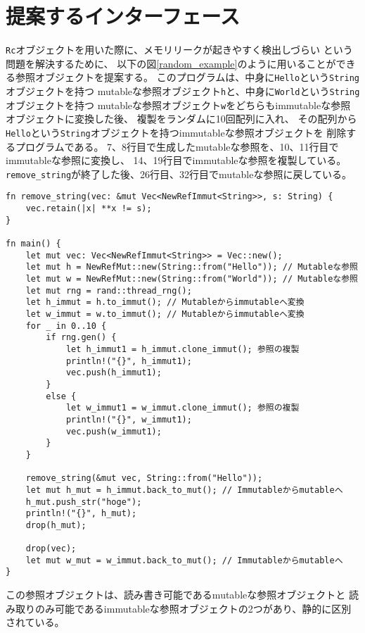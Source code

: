 \documentclass{sumiilab-paper}
\theoremstyle{mystyle}
\numberwithin{definition}{chapter} %
\begin{document}
\section{提案するインターフェース}
\texttt{Rc}オブジェクトを用いた際に、メモリリークが起きやすく検出しづらい
という問題を解決するために、
以下の図\ref{random_example}のように用いることができる参照オブジェクトを提案する。
このプログラムは、中身に\texttt{Hello}という\texttt{String}オブジェクトを持つ
mutableな参照オブジェクト\texttt{h}と、中身に\texttt{World}という\texttt{String}オブジェクトを持つ
mutableな参照オブジェクト\texttt{w}をどちらもimmutableな参照オブジェクトに変換した後、
複製をランダムに10回配列に入れ、
その配列から\texttt{Hello}という\texttt{String}オブジェクトを持つimmutableな参照オブジェクトを
削除するプログラムである。
7、8行目で生成したmutableな参照を、10、11行目でimmutableな参照に変換し、
14、19行目でimmutableな参照を複製している。
\texttt{remove\_string}が終了した後、26行目、32行目でmutableな参照に戻している。
\begin{lstlisting}[caption=新たな参照オブジェクトを用いた柔軟なメモリ管理の例, 
  label=random_example, captionpos=b]
fn remove_string(vec: &mut Vec<NewRefImmut<String>>, s: String) {
    vec.retain(|x| **x != s);
}

fn main() {
    let mut vec: Vec<NewRefImmut<String>> = Vec::new();
    let mut h = NewRefMut::new(String::from("Hello")); // Mutableな参照
    let mut w = NewRefMut::new(String::from("World")); // Mutableな参照
    let mut rng = rand::thread_rng();
    let h_immut = h.to_immut(); // Mutableからimmutableへ変換
    let w_immut = w.to_immut(); // Mutableからimmutableへ変換
    for _ in 0..10 {
        if rng.gen() {
            let h_immut1 = h_immut.clone_immut(); 参照の複製
            println!("{}", h_immut1);
            vec.push(h_immut1);
        }
        else {
            let w_immut1 = w_immut.clone_immut(); 参照の複製
            println!("{}", w_immut1);
            vec.push(w_immut1);
        }
    }

    remove_string(&mut vec, String::from("Hello"));
    let mut h_mut = h_immut.back_to_mut(); // Immutableからmutableへ
    h_mut.push_str("hoge");
    println!("{}", h_mut);
    drop(h_mut);

    drop(vec);
    let mut w_mut = w_immut.back_to_mut(); // Immutableからmutableへ
}
\end{lstlisting}
この参照オブジェクトは、読み書き可能であるmutableな参照オブジェクトと
読み取りのみ可能であるimmutableな参照オブジェクトの2つがあり、静的に区別されている。
\end{document}
